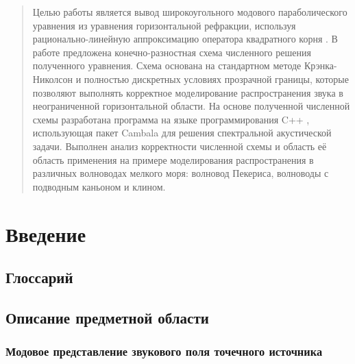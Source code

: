 \documentclass{fefu}
\begin{document}
    \setcounter{page}{2}
    \maketableofcontents
    \begin{abstract}
        \par Целью работы является вывод широкоугольного модового параболического уравнения из уравнения горизонтальной рефракции, используя рационально-линейную аппроксимацию оператора квадратного корня \cite{jensen}. В работе предложена конечно-разностная схема численного решения полученного уравнения. Схема основана на стандартном методе Крэнка-Николсон \cite{crank} и полностью дискретных условиях прозрачной границы, которые позволяют выполнять корректное моделирование распространения звука в неограниченной горизонтальной области. На основе полученной численной схемы разработана программа на языке программирования C++ \cite{c++}, использующая пакет Cambala \cite{cambala} для решения спектральной акустической задачи. Выполнен анализ корректности численной схемы и область её область применения на примере моделирования распространения в различных волноводах мелкого моря: волновод Пекериса, волноводы с подводным каньоном и клином.
    \end{abstract}
    \section{Введение}
        \subsection{Глоссарий}
            \printglossary[numberedsection,title=Термины]
              \printglossary[numberedsection,type=\acronymtype,title=Сокращения]
        \subsection{Описание предметной области}
            \subsubsection{Модовое представление звукового поля точечного источника}
\end{document}
